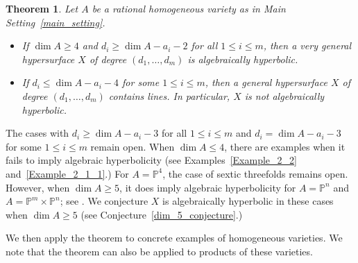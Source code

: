 \documentclass[11pt]{amsart}
\numberwithin{equation}{section}
\newtheorem{theorem}{Theorem}[section]
\theoremstyle{definition}
\theoremstyle{remark}
\renewcommand{\P}{\mathbb{P}}
\begin{document}
\begin{theorem}\label{main_theorem} Let $A$ be a rational homogeneous variety as in Main Setting~\ref{main_setting}.
    \begin{itemize}
        \item If $\dim A\ge 4$ and $d_i\ge \dim A-a_i-2$ for all $1\le i\le m$, then a very general hypersurface $X$ of degree $(d_1, \hdots, d_m)$ is algebraically hyperbolic.
        \item If $d_i\le \dim A - a_i - 4$ for some $1\le i\le m$, then a general hypersurface $X$ of degree $(d_1, \hdots, d_m)$ contains lines. In particular, $X$ is not algebraically hyperbolic.
    \end{itemize}
\end{theorem}

The cases with $d_i\ge \dim A - a_i - 3$ for all $1\le i\le m$ and $d_i = \dim A-a_i-3$ for some $1\le i\le m$ remain open. When $\dim A\le 4$, there are examples when it fails to imply algebraic hyperbolicity (see Examples~\ref{Example_2_2} and~\ref{Example_2_1_1}.) For $A=\P^4$, the case of sextic threefolds remains open. However, when $\dim A\ge 5$, it does imply algebraic hyperbolicity for $A=\P^n$ and $A=\P^m\times \P^n$; see \cite{Y22}. We conjecture $X$ is algebraically hyperbolic in these cases when $\dim A\ge 5$ (see Conjecture~\ref{dim_5_conjecture}.)

We then apply the theorem to concrete examples of homogeneous varieties. We note that the theorem can also be applied to products of these varieties.
\end{document}
